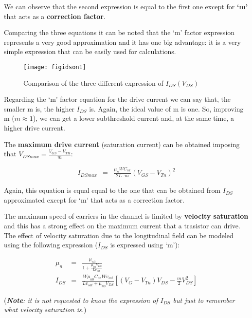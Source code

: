 \documentclass[a4paper, 12pt, twoside, openright]{report}
\begin{document}
We can observe that the second expression is equal to the first one except for \textbf{`m'} that acts as a \textbf{correction factor}.

Comparing the three equations it can be noted that the `m' factor expression represents a very good approximation and it has one big advantage: it is a very simple expression that can be easily used for calculations.


	\begin{figure}[H]
	\centering
	\texttt{[image: figidson1]}
	\caption{Comparison of the three different expression of $I_{DS}(V_{DS})$}
	\label{}
	\end{figure}

Regarding the `m' factor equation for the drive current we can say that, the smaller m is, the higher $I_{DS}$ is. Again, the ideal value of m is one. So, improving m ($m \approx 1$), we can get a lower subthreshold current and, at the same time, a higher drive current.

The \textbf{maximum drive current} (saturation current) can be obtained imposing that $V_{DSmax} = \frac{V_{GS} - V_{TH}}{m}$:

   \begin{eqnarray*}    
       I_{DSmax}&=& \frac{\mu_n W C_{ox}}{2L \cdot  {m}}\left(V_{GS}-V_{Tn}\right)^2
    \end{eqnarray*}

Again, this equation is equal equal to the one that can be obtained from $I_{DS}$ approximated except for `m' that acts as a correction factor.

The maximum speed of carriers in the channel is limited by \textbf{velocity saturation} and this has a strong effect on the maximum current that a trasistor can drive. The effect of velocity saturation due to the longitudinal field can be modeled using the following expression ($I_{DS}$ is expressed using `m'):

	\begin{eqnarray*}
	     \mu_n&=&\frac{\mu_{n0}}{1+\frac{\mu_{n0}V_{DS}}{Lv_{sat}}}\\[2ex]
	   I_{DS} &=&\frac{W \mu_{n0} C_{ox}Wv_{sat}}{Lv_{sat}+\mu_{n0}V_{DS}}
	             \left[\left(V_G-V_{Tn}\right)V_{DS}-\frac{ {m}}{2}V_{DS}^2\right]
	\end{eqnarray*}

(\emph{\textbf{Note}: it is not requested to know the expression of $I_{DS}$ but just to remember what velocity saturation is.})
\end{document}
